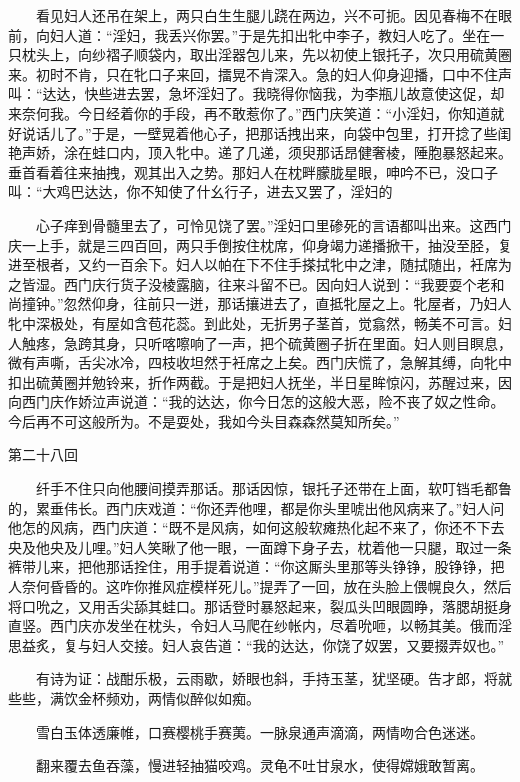 　　看见妇人还吊在架上，两只白生生腿儿跷在两边，兴不可扼。因见春梅不在眼前，向妇人道：“淫妇，我丢兴你罢。”于是先扣出牝中李子，教妇人吃了。坐在一只枕头上，向纱褶子顺袋内，取出淫器包儿来，先以初使上银托子，次只用硫黄圈来。初时不肯，只在牝口子来回，擂晃不肯深入。急的妇人仰身迎播，口中不住声叫：“达达，快些进去罢，急坏淫妇了。我晓得你恼我，为李瓶儿故意使这促，却来奈何我。今日经着你的手段，再不敢惹你了。”西门庆笑道：“小淫妇，你知道就好说话儿了。”于是，一壁晃着他心子，把那话拽出来，向袋中包里，打开捻了些闺艳声娇，涂在蛙口内，顶入牝中。递了几递，须臾那话昂健奢棱，陲胞暴怒起来。垂首看着往来抽拽，观其出入之势。那妇人在枕畔朦胧星眼，呻吟不已，没口子叫：“大鸡巴达达，你不知使了什幺行子，进去又罢了，淫妇的


　　心子痒到骨髓里去了，可怜见饶了罢。”淫妇口里碜死的言语都叫出来。这西门庆一上手，就是三四百回，两只手倒按住枕席，仰身竭力递播掀干，抽没至胫，复进至根者，又约一百余下。妇人以帕在下不住手搽拭牝中之津，随拭随出，衽席为之皆湿。西门庆行货子没棱露脑，往来斗留不已。因向妇人说到：“我要耍个老和尚撞钟。”忽然仰身，往前只一迸，那话攘进去了，直抵牝屋之上。牝屋者，乃妇人牝中深极处，有屋如含苞花蕊。到此处，无折男子茎首，觉翕然，畅美不可言。妇人触疼，急跨其身，只听喀嚓响了一声，把个硫黄圈子折在里面。妇人则目瞑息，微有声嘶，舌尖冰冷，四枝收坦然于衽席之上矣。西门庆慌了，急解其缚，向牝中扣出硫黄圈并勉铃来，折作两截。于是把妇人抚坐，半日星眸惊闪，苏醒过来，因向西门庆作娇泣声说道：“我的达达，你今日怎的这般大恶，险不丧了奴之性命。今后再不可这般所为。不是耍处，我如今头目森森然莫知所矣。”


第二十八回

　　纤手不住只向他腰间摸弄那话。那话因惊，银托子还带在上面，软叮铛毛都鲁的，累垂伟长。西门庆戏道：“你还弄他哩，都是你头里唬出他风病来了。”妇人问他怎的风病，西门庆道：“既不是风病，如何这般软瘫热化起不来了，你还不下去央及他央及儿哩。”妇人笑瞅了他一眼，一面蹲下身子去，枕着他一只腿，取过一条裤带儿来，把他那话拴住，用手提着说道：“你这厮头里那等头铮铮，股铮铮，把人奈何昏昏的。这咋你推风症模样死儿。”提弄了一回，放在头脸上偎幌良久，然后将口吮之，又用舌尖舔其蛙口。那话登时暴怒起来，裂瓜头凹眼圆睁，落腮胡挺身直竖。西门庆亦发坐在枕头，令妇人马爬在纱帐内，尽着吮咂，以畅其美。俄而淫思益炙，复与妇人交接。妇人哀告道：“我的达达，你饶了奴罢，又要掇弄奴也。”


　　有诗为证：战酣乐极，云雨歇，娇眼也斜，手持玉茎，犹坚硬。告才郎，将就些些，满饮金杯频劝，两情似醉似如痴。

　　雪白玉体透廉帷，口赛樱桃手赛荑。一脉泉通声滴滴，两情吻合色迷迷。

　　翻来覆去鱼吞藻，慢进轻抽猫咬鸡。灵龟不吐甘泉水，使得嫦娥敢暂离。

